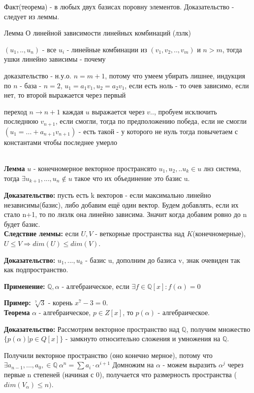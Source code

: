 \documentclass[12pt]{article}
\begin{document}
Факт(теорема) - в любых двух базисах поровну элементов. Доказательство - следует из леммы.

Лемма О линейной зависимости линейных комбинаций  (лзлк)

$(u_1, .., u_n)$ - все $u_i$ - линейные комбинации из $(v_1, v_2, .. , v_m)$ и $n > m$, тогда ушки линейно зависимы - почему

доказательство - н.у.о. $n = m + 1$, потому что умеем убирать лишнее, индукция по $n$ - база - $n = 2$, $u_1 = a_1v_1, u_2 = a_2v_1$, если есть ноль - то очев зависимо, если нет, то второй выражается через первый

переход $n \rightarrow n + 1$ каждая $u$ выражается через $v$.., пробуем исключить последнюю $v_{n + 1}$, если смогли, тогда по предположению победа, если не смогли $(u_1 = ... + a_{n + 1}v_{n + 1})$ - есть такой - у которого не нуль тогда повычетаем с константами чтобы последнее умерло 

\\

\textbf{Лемма}  $u$ - конечномерное векторное пространсвто $u_1, u_2, .. u_k \in u$ лнз система, тогда $\exists u_{k + 1}, ..., u_n \notin u$ такое что их объединение это базис u.

\textbf{Доказательство:} пусть есть k векторов - если максимально линейно независимы(базис), либо добавим ещё один вектор. Будем добавлять, если их стало n+1, то по лнзлк она линейно зависима. Значит когда добавим ровно до n будет базис.
\\

\textbf{Следствие леммы:} если $U, V$ - веткорные пространства над $K$(конечномерные), $U \leq V \Rightarrow dim(U) \leq dim(V)$.

\textbf{Доказательство:} $u_1, ..., u_k$ - базис u, дополним до базиса v, знак очевиден так как подпространство.

\textbf{Применение:} $\mathbb{Q}, \alpha$ - алгебраическое, если $\exists f \in \mathbb{Q}[x]: f(\alpha) = 0$

\textbf{Пример:} $\sqrt[7]{3}$ - корень $x^7 - 3 = 0$. 
\\

\textbf{Теорема} $\alpha$ - алгебраическое, $ p \in Z[x]$, то  $p(\alpha)$ - алгебраическое.

\textbf{Доказательство:} Рассмотрим векторное пространство над $\mathbb{Q}$, получим множество $\{p(\alpha) | p \in Q[x]\}$ - замкнуто относительно сложения и умножения на $\mathbb{Q}$.

Получили векторное пространство (оно конечно мерное), потому что $\exists a_{n - 1}, ..., a_0, \in \mathbb{Q} \ \alpha^n = \sum {a_i \cdot \alpha^{i + 1}}$ Домножим на $\alpha$ - можем выразить $\alpha^j$ через первые n степеней (начиная с 0), получается что размерность пространства ($dim(V_{\alpha}) \leq n)$. 
\end{document}
